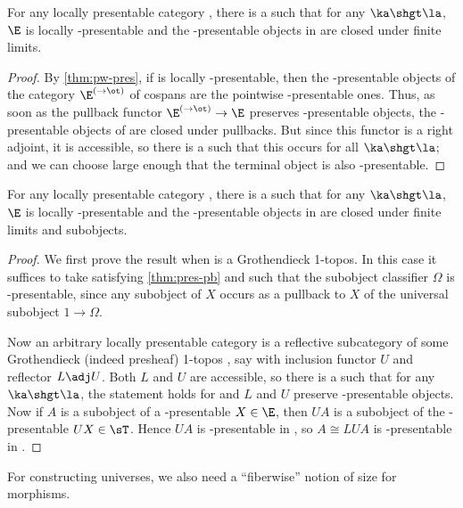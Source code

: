 \begin{prop}\label{thm:pres-pb}
  For any locally presentable category \E, there is a \la such that for any $\ka\shgt \la$, $\E$ is locally \ka-presentable and the \ka-presentable objects in \E are closed under finite limits.%
\end{prop}
\begin{proof}
  By \cref{thm:pw-pres}, if \E is locally \ka-presentable, then the \ka-presentable objects of the category $\E^{(\to\ot)}$ of cospans are the pointwise \ka-presentable ones.
  Thus, as soon as the pullback functor $\E^{(\to\ot)} \to \E$ preserves \ka-presentable objects, the \ka-presentable objects of \E are closed under pullbacks.
  But since this functor is a right adjoint, it is accessible, so there is a \la such that this occurs for all $\ka\shgt\la$; and we can choose \la large enough that the terminal object is also \la-presentable.
\end{proof}

\begin{prop}\label{thm:pres-sub}
  For any locally presentable category \E, there is a \la such that for any $\ka\shgt \la$, $\E$ is locally \ka-presentable and the \ka-presentable objects in \E are closed under finite limits and subobjects.
\end{prop}
\begin{proof}
  We first prove the result when \E is a Grothendieck 1-topos.
  In this case it suffices to take \la satisfying \cref{thm:pres-pb} and such that the subobject classifier $\Omega$ is \la-presentable, since any subobject of $X$ occurs as a pullback to $X$ of the universal subobject $1\to \Omega$.

  Now an arbitrary locally presentable category \E is a reflective subcategory of some Grothendieck (indeed presheaf) 1-topos \sT, say with inclusion functor $U$ and reflector $L\adj U$.
  Both $L$ and $U$ are accessible, so there is a \la such that for any $\ka\shgt \la$, the statement holds for \sT and $L$ and $U$ preserve \ka-presentable objects.
  Now if $A$ is a subobject of a \ka-presentable $X\in \E$, then $UA$ is a subobject of the \ka-presentable $UX\in \sT$.
  Hence $U A$ is \ka-presentable in \sT, so $A \cong L U A$ is \ka-presentable in \E.
\end{proof}

For constructing universes, we also need a ``fiberwise'' notion of size for morphisms.

